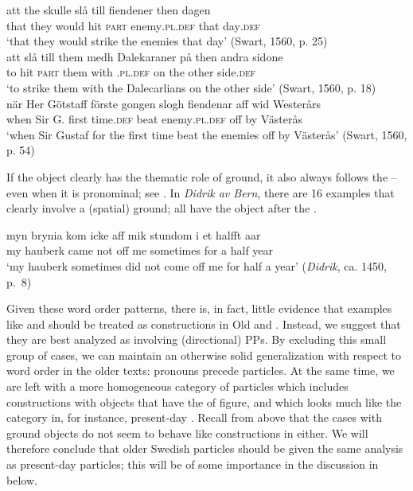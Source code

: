 \documentclass[output=paper]{langscibook}
\begin{document}
\ea\label{ex:lalu:26}
\ea\label{ex:lalu:26a}
\gll  att   the     skulle   slå   till   fiendener         then   dagen\\
    that   they   would   hit  \textsc{part}   enemy\textsc{.pl.def}   that   day\textsc{.def} \\
\glt `that they would strike the enemies that day’ (Swart, 1560, p. 25)\\

\ex\label{ex:lalu:26b}
\gll  att   slå   till   them   medh   Dalekaraner       på   then {andra}   {sidone}\\
    to     hit  \textsc{part}  them   with     \textsc{.pl.def}   on   the other     side.\textsc{def}\\
\glt `to strike them with the Dalecarlians on the other side’ (Swart, 1560, p. 18)\\
\z
\ex\label{ex:lalu:27}
\gll  när    Her  Götstaff   förste    gongen   slogh   fiendenar aff   wid  Westerårs\\
when   Sir  G.       first     time.\textsc{def}   beat     enemy\textsc{.pl.def}  off   by   Västerås\\
\glt `when Sir Gustaf for the first time beat the enemies off by Västerås' (Swart, 1560, p. 54)\\
\z

If the object clearly has the thematic role of ground, it also always follows the  – even when it is pronominal; see . In \textit{Didrik av Bern}, there are 16 examples that clearly involve a (spatial) ground; all have the object after the .


\ea\label{ex:lalu:28}
\gll  myn   brynia   kom   icke   aff   mik   stundom   i     et   halfft  aar\\
my     hauberk     came  not     off   me   sometimes   for   a   half   year \\
\glt `my hauberk sometimes did not come off me for half a year’ (\textit{Didrik}, ca. 1450, p.~8)\\
\z

Given these word order patterns, there is, in fact, little evidence that examples like  and  should be treated as  constructions in Old and . Instead, we suggest that they are best analyzed as involving (directional) PPs. By excluding this small group of cases, we can maintain an otherwise solid generalization with respect to word order in the older texts: pronouns precede particles. At the same time, we are left with a more homogeneous category of particles which includes constructions with objects that have the  of figure, and which looks much like the  category in, for instance, present-day . Recall from  above that the cases with ground objects do not seem to behave like  constructions in  either. We will therefore conclude that older Swedish particles should be given the same analysis as present-day  particles; this will be of some importance in the discussion in  below.
\end{document}
